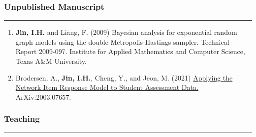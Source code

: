 \documentclass[
]{book}
\begin{document}
\hypertarget{unpublished-manuscript}{%
\subsubsection*{Unpublished Manuscript}\label{unpublished-manuscript}}

\begin{center}\rule{0.5\linewidth}{0.5pt}\end{center}

\begin{enumerate}
\def\labelenumi{\arabic{enumi}.}
\item
  \textbf{Jin, I.H.} and Liang, F. (2009) Bayesian analysis for exponential random graph models using the double Metropolis-Hastings sampler. Technical Report 2009-097. Institute for Applied Mathematics and Computer Science, Texas A\&M University.
\item
  Brodersen, A., \textbf{Jin, I.H.}, Cheng, Y., and Jeon, M. (2021) \href{https://arxiv.org/abs/2003.07657}{Applying the Network Item Response Model to Student Assessment Data.} ArXiv:2003.07657.
\end{enumerate}

\hypertarget{teaching}{%
\subsubsection*{Teaching}\label{teaching}}

\begin{center}\rule{0.5\linewidth}{0.5pt}\end{center}
\end{document}
